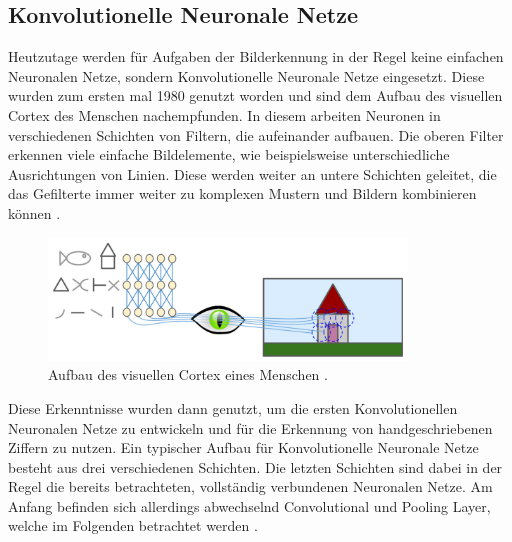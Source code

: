 \documentclass[11pt,bibliography=totocnumbered]{scrartcl}
\begin{document}
\subsection{Konvolutionelle Neuronale Netze}
Heutzutage werden für Aufgaben der Bilderkennung in der Regel keine einfachen Neuronalen Netze, sondern Konvolutionelle Neuronale Netze eingesetzt. Diese wurden zum ersten mal 1980 genutzt worden und sind dem Aufbau des visuellen Cortex des Menschen nachempfunden. In diesem arbeiten Neuronen in verschiedenen Schichten von Filtern, die aufeinander aufbauen. Die oberen Filter erkennen viele einfache Bildelemente, wie beispielsweise unterschiedliche Ausrichtungen von Linien. Diese werden weiter an untere Schichten geleitet, die das Gefilterte immer weiter zu komplexen Mustern und Bildern kombinieren können \cite[S.360]{MACHINE_LEARNING}. 
\begin{figure}[H]
	\centering
	\includegraphics[width=0.85\textwidth]{visueller_cortex}
	\vspace*{-3mm}
	\caption[Aufbau des visuellen Cortex]{Aufbau des visuellen Cortex eines Menschen \cite[S.360]{MACHINE_LEARNING}.}
	\label{fig:visueller_cortex}
\end{figure}
\vspace*{-5mm}
Diese Erkenntnisse wurden dann genutzt, um die ersten Konvolutionellen Neuronalen Netze zu entwickeln und für die Erkennung von handgeschriebenen Ziffern zu nutzen. Ein typischer Aufbau für Konvolutionelle Neuronale Netze besteht aus drei verschiedenen Schichten. Die letzten Schichten sind dabei in der Regel die bereits betrachteten, vollständig verbundenen Neuronalen Netze. Am Anfang befinden sich allerdings abwechselnd Convolutional und Pooling Layer, welche im Folgenden betrachtet werden \cite[S.361]{MACHINE_LEARNING}.
\end{document}
